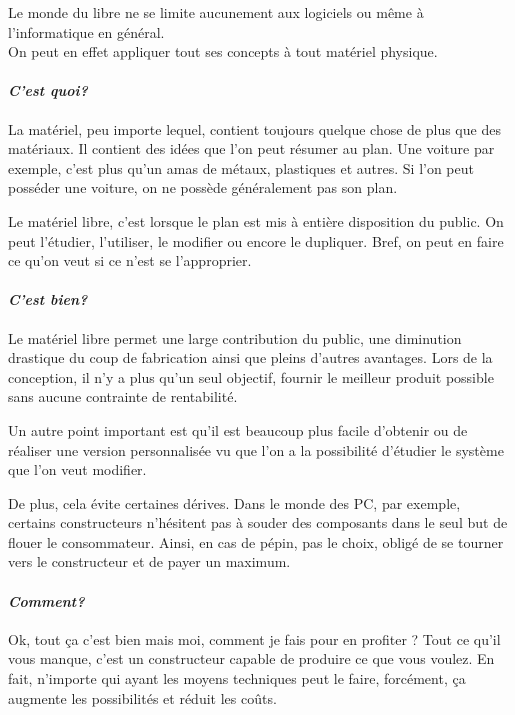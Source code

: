 




\vspace{.6cm}
Le monde du libre ne se limite aucunement aux logiciels ou même à l'informatique en général.\\
On peut en effet appliquer tout ses concepts à tout matériel physique.

\paragraph{\textit{C'est quoi?}}
La matériel, peu importe lequel, contient toujours quelque chose de plus que des matériaux. Il contient des idées que l'on peut résumer au plan. Une voiture par exemple, c'est plus qu'un amas de métaux, plastiques et autres. Si l'on peut posséder une voiture, on ne possède généralement pas son plan.

Le matériel libre, c'est lorsque le plan est mis à entière disposition du public. On peut l'étudier, l'utiliser, le modifier ou encore le dupliquer. Bref, on peut en faire ce qu'on veut si ce n'est se l'approprier.

\paragraph{\textit{C'est bien?}}
Le matériel libre permet une large contribution du public, une diminution drastique du coup de fabrication ainsi que pleins d'autres avantages. Lors de la conception, il n'y a plus qu'un seul objectif, fournir le meilleur produit possible sans aucune contrainte de rentabilité.

Un autre point important est qu'il est beaucoup plus facile d'obtenir ou de réaliser une version personnalisée vu que l'on a la possibilité d'étudier le système que l'on veut modifier.

De plus, cela évite certaines dérives. Dans le monde des PC, par exemple, certains constructeurs n'hésitent pas à souder des composants dans le seul but de flouer le consommateur. Ainsi, en cas de pépin, pas le choix, obligé de se tourner vers le constructeur et de payer un maximum.

\paragraph{\textit{Comment?}}
Ok, tout ça c'est bien mais moi, comment je fais pour en profiter ? Tout ce qu'il vous manque, c'est un constructeur capable de produire ce que vous voulez. En fait, n'importe qui ayant les moyens techniques peut le faire, forcément, ça augmente les possibilités et réduit les coûts.

